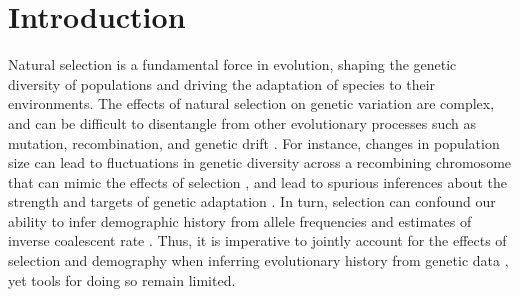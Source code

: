 \documentclass[hidelinks]{article}
\begin{document}
\section*{Introduction}
    \label{introduction}
    Natural selection is a fundamental force in evolution, shaping the
    genetic diversity of populations and driving the adaptation of
    species to their environments. The effects of natural selection
    on genetic variation are complex, and can be difficult to disentangle
    from other evolutionary processes such as mutation, recombination,
    and genetic drift \citep[e.g.,][]{gillespie1991causes}.
    For instance, changes in population size can lead to fluctuations
    in genetic diversity across a recombining chromosome 
    that can mimic the effects of selection \citep{simonsen1995properties},
    and lead to spurious inferences about the strength and targets of genetic adaptation
    \citep{simonsen1995properties,akey2004population,nielsen2005genomic}.
    In turn, selection can confound our ability to infer demographic 
    history from allele frequencies \citep{ewing2016consequences,schrider2016effects} and
    estimates of inverse coalescent rate \citep{schrider2016effects, johri2021impact, cousins2024accurate}.
    Thus, it is imperative to jointly account for the effects of selection
    and demography when inferring evolutionary history from genetic data \citep[e.g.,][]{sheehan2016deep,johri2020toward},
    yet tools for doing so remain limited.
\end{document}
